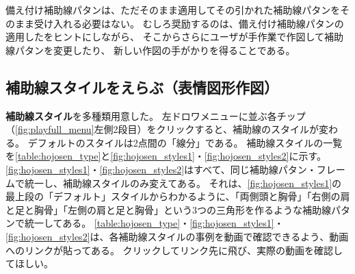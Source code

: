 備え付け補助線パタンは、ただそのまま適用してその引かれた補助線パタンをそのまま受け入れる必要はない。
むしろ奨励するのは、備え付け補助線パタンの適用したをヒントにしながら、
そこからさらにユーザが手作業で作図して補助線パタンを変更したり、
新しい作図の手がかりを得ることである。

\subsection{補助線スタイルをえらぶ（表情図形作図）}
\label{sec:hojosentype}
\textbf{補助線スタイル}を多種類用意した。
左ドロワメニューに並ぶ各チップ（\autoref{fig:playfull_menu}左側2段目）をクリックすると、補助線のスタイルが変わる。
デフォルトのスタイルは2点間の「線分」である。
補助線スタイルの一覧を\autoref{table:hojosen_type}と\autoref{fig:hojosen_styles1}・\autoref{fig:hojosen_styles2}に示す。
  \autoref{fig:hojosen_styles1}・\autoref{fig:hojosen_styles2}はすべて、同じ補助線パタン・フレームで統一し、補助線スタイルのみ変えてある。
それは、\autoref{fig:hojosen_styles1}の最上段の「デフォルト」スタイルからわかるように、「両側頭と胸骨」「右側の肩と足と胸骨」「左側の肩と足と胸骨」という3つの三角形を作るような補助線パタンで統一してある。
\autoref{table:hojosen_type}・\autoref{fig:hojosen_styles1}・\autoref{fig:hojosen_styles2}は、各補助線スタイルの事例を動画で確認できるよう、動画へのリンクが貼ってある。
クリックしてリンク先に飛び、実際の動画を確認してほしい。


